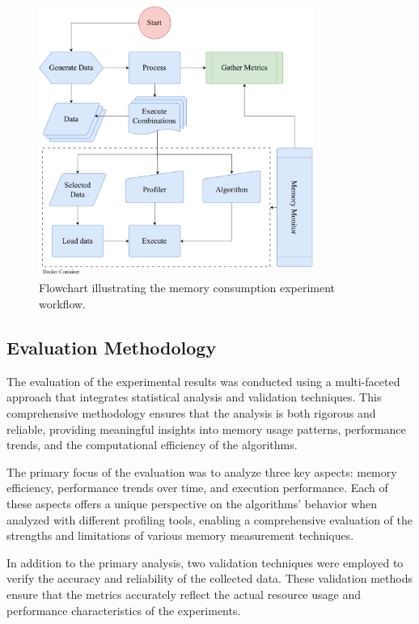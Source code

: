 \begin{figure}[h]
    \centering
    \includegraphics[width=0.8\textwidth]{./assets/images/04-experiment-flowchart}
    \caption{Flowchart illustrating the memory consumption experiment workflow.}
    \label{fig:mmc-experiment-workflow}
\end{figure}

\subsection{Evaluation Methodology}
\label{subsec:mmc-evaluation-methodology}

The evaluation of the experimental results was conducted using a multi-faceted approach that integrates statistical analysis and validation techniques.
This comprehensive methodology ensures that the analysis is both rigorous and reliable, providing meaningful insights into memory usage patterns, performance trends, and the computational efficiency of the algorithms.

The primary focus of the evaluation was to analyze three key aspects: memory efficiency, performance trends over time, and execution performance.
Each of these aspects offers a unique perspective on the algorithms’ behavior when analyzed with different profiling tools, enabling a comprehensive evaluation of the strengths and limitations of various memory measurement techniques.

In addition to the primary analysis, two validation techniques were employed to verify the accuracy and reliability of the collected data.
These validation methods ensure that the metrics accurately reflect the actual resource usage and performance characteristics of the experiments.

